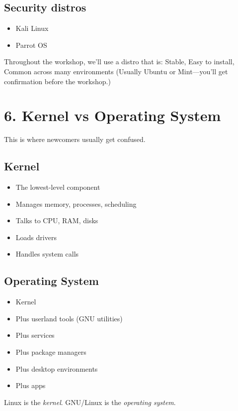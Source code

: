 \documentclass[12pt]{article}
\begin{document}
\subsection*{Security distros}
\begin{itemize}
    \item Kali Linux
    \item Parrot OS
\end{itemize}

\begin{infobox}
Throughout the workshop, we'll use a distro that is: Stable, Easy to install, Common across many environments (Usually Ubuntu or Mint—you'll get confirmation before the workshop.)
\end{infobox}

\section*{6. Kernel vs Operating System}

This is where newcomers usually get confused.

\subsection*{Kernel}
\begin{itemize}
    \item The lowest-level component
    \item Manages memory, processes, scheduling
    \item Talks to CPU, RAM, disks
    \item Loads drivers
    \item Handles system calls
\end{itemize}

\subsection*{Operating System}
\begin{itemize}
    \item Kernel
    \item Plus userland tools (GNU utilities)
    \item Plus services
    \item Plus package managers
    \item Plus desktop environments
    \item Plus apps
\end{itemize}

Linux is the \textit{kernel}. GNU/Linux is the \textit{operating system}.
\end{document}
